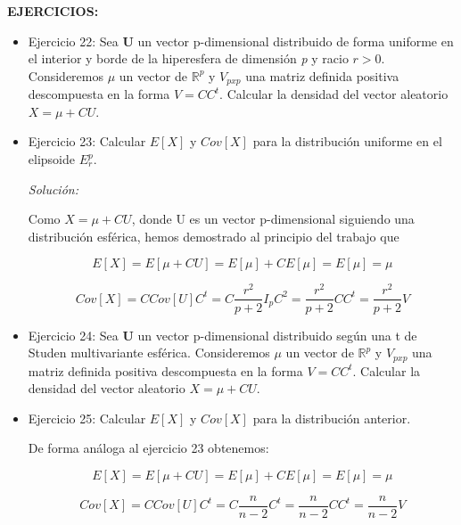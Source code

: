 \documentclass{article}
\theoremstyle{theorem-style}  %
\theoremstyle{definition}
\theoremstyle{example-style}
\begin{document}
	\textbf{EJERCICIOS:}
	\begin{itemize}
		\item Ejercicio 22:  Sea \textbf{U} un vector p-dimensional distribuido de forma uniforme en el interior y borde de la hiperesfera de dimensión \textit{p} y racio $r>0.$ Consideremos $\mu$ un vector de $\mathbb{R}^p$ y $V_{pxp}$ una matriz definida positiva descompuesta en la forma $V=CC^t$. Calcular la densidad del vector aleatorio $X=\mu+CU$.
		
		
		
		\item Ejercicio 23: Calcular $E[X]$ y $Cov[X]$ para la distribución uniforme en el elipsoide $E^p_r$.
		
		\textit{Solución:}
		
		Como $X = \mu + CU$, donde U es un vector p-dimensional siguiendo una distribución esférica, hemos demostrado al principio del trabajo que
		
		\[
			E[X] = E[\mu + CU] = E[\mu] + CE[\mu] = E[\mu] = \mu
		\]
		
		\[
			Cov[X] = C Cov[U] C^t = C \frac{r^2}{p+2}I_p C^2 = \frac{r^2}{p+2} C C^t =  \frac{r^2}{p+2} V
 		\]
		
		\item Ejercicio 24: Sea \textbf{U} un vector p-dimensional distribuido según una t de Studen multivariante esférica. Consideremos $\mu$ un vector de $\mathbb{R}^p$ y $V_{pxp}$ una matriz definida positiva descompuesta en la forma $V=CC^t$. Calcular la densidad del vector aleatorio $X=\mu+CU$. 
		
		\item Ejercicio 25: Calcular $E[X]$ y $Cov[X]$ para la distribución anterior.
		
		De forma análoga al ejercicio 23 obtenemos:
		
		\[
			E[X] = E[\mu + CU] = E[\mu] + CE[\mu] = E[\mu] = \mu
		\]
		
		\[
			Cov[X] = C Cov[U] C^t = C \frac{n}{n-2} C^t = \frac{n}{n-2} C C^t = \frac{n}{n-2}  V 
		\]
		
	\end{itemize}
	
\end{document}
